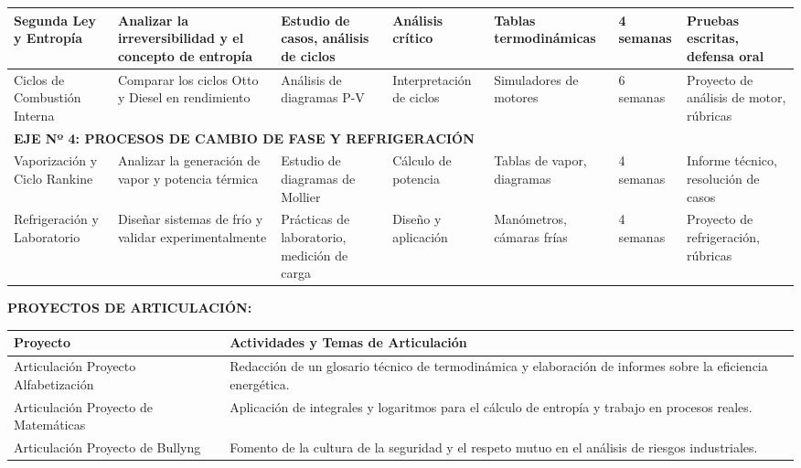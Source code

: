 \documentclass[11pt, a4paper]{article}
\begin{document}
\begin{longtable}{|p{2.5cm}|p{3cm}|p{4cm}|p{3cm}|p{2.5cm}|p{1.5cm}|p{3cm}|}
\hline
Segunda Ley y Entropía & Analizar la irreversibilidad y el concepto de entropía & Estudio de casos, análisis de ciclos & Análisis crítico & Tablas termodinámicas & 4 semanas & Pruebas escritas, defensa oral \\
\hline
Ciclos de Combustión Interna & Comparar los ciclos Otto y Diesel en rendimiento & Análisis de diagramas P-V & Interpretación de ciclos & Simuladores de motores & 6 semanas & Proyecto de análisis de motor, rúbricas \\
\hline
\multicolumn{7}{|l|}{\textbf{EJE Nº 4: PROCESOS DE CAMBIO DE FASE Y REFRIGERACIÓN}} \\
\hline
Vaporización y Ciclo Rankine & Analizar la generación de vapor y potencia térmica & Estudio de diagramas de Mollier & Cálculo de potencia & Tablas de vapor, diagramas & 4 semanas & Informe técnico, resolución de casos \\
\hline
Refrigeración y Laboratorio & Diseñar sistemas de frío y validar experimentalmente & Prácticas de laboratorio, medición de carga & Diseño y aplicación & Manómetros, cámaras frías & 4 semanas & Proyecto de refrigeración, rúbricas \\
\hline
\end{longtable}

\vspace{1em}
\noindent \textbf{PROYECTOS DE ARTICULACIÓN:}
\begin{tabular}{|p{5cm}|p{12cm}|}
\hline
\rowcolor{gray!20} \textbf{Proyecto} & \textbf{Actividades y Temas de Articulación} \\
\hline
Articulación Proyecto Alfabetización & Redacción de un glosario técnico de termodinámica y elaboración de informes sobre la eficiencia energética. \\
\hline
Articulación Proyecto de Matemáticas & Aplicación de integrales y logaritmos para el cálculo de entropía y trabajo en procesos reales. \\
\hline
Articulación Proyecto de Bullyng & Fomento de la cultura de la seguridad y el respeto mutuo en el análisis de riesgos industriales. \\
\hline
\end{tabular}
\end{document}
